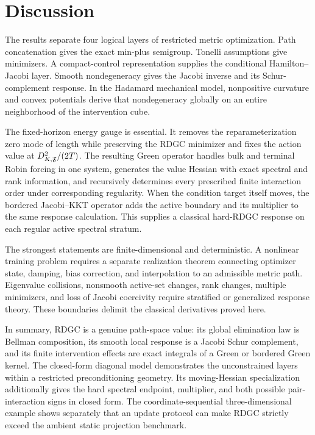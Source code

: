 \section{Discussion}
\label{sec:discussion}

The results separate four logical layers of restricted metric optimization.
Path concatenation gives the exact min-plus semigroup.  Tonelli assumptions
give minimizers.  A compact-control representation supplies the conditional
Hamilton--Jacobi layer.  Smooth nondegeneracy gives the Jacobi inverse and its
Schur-complement response.  In the Hadamard mechanical model, nonpositive
curvature and convex potentials derive that nondegeneracy globally on an
entire neighborhood of the intervention cube.

The fixed-horizon energy gauge is essential.  It removes the
reparameterization zero mode of length while preserving the RDGC minimizer and
fixes the action value at \(D_{K,\mathfrak F}^2/(2T)\).  The resulting Green operator
handles bulk and terminal Robin forcing in one system, generates the value
Hessian with exact spectral and rank information, and recursively determines
every prescribed finite interaction order under corresponding regularity.
When the condition target itself moves, the
bordered Jacobi--KKT operator adds the active boundary and its multiplier to
the same response calculation.  This supplies a classical hard-RDGC response
on each regular active spectral stratum.

The strongest statements are finite-dimensional and deterministic.  A
nonlinear training problem requires a separate realization theorem connecting
optimizer state, damping, bias correction, and interpolation to an admissible
metric path.  Eigenvalue collisions, nonsmooth active-set changes, rank
changes, multiple minimizers, and loss of Jacobi coercivity require stratified
or generalized response theory.  These boundaries delimit the classical
derivatives proved here.

In summary, RDGC is a genuine path-space value: its global elimination law is
Bellman composition, its smooth local response is a Jacobi Schur complement,
and its finite intervention effects are exact integrals of a Green or bordered
Green kernel.  The closed-form diagonal model demonstrates the unconstrained
layers within a restricted preconditioning geometry.  Its moving-Hessian
specialization additionally gives the hard spectral endpoint, multiplier, and
both possible pair-interaction signs in closed form.  The coordinate-sequential
three-dimensional example shows separately that an update protocol can make
RDGC strictly exceed the ambient static projection benchmark.

